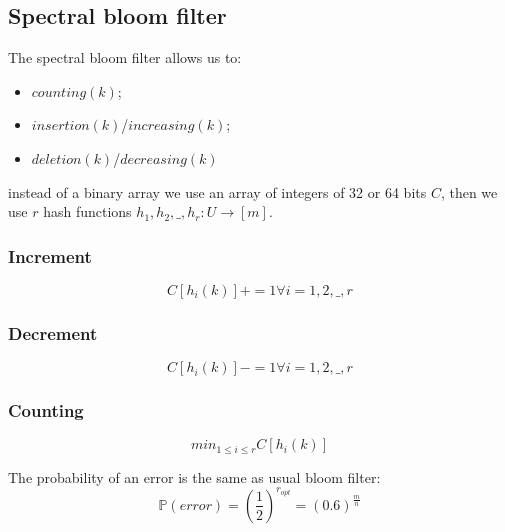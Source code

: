 \subsection{Spectral bloom filter}
The spectral bloom filter allows us to:
\begin{itemize}
    \item $counting(k)$;
    \item $insertion(k)$/$increasing(k)$;
    \item $deletion(k)$/$decreasing(k)$
\end{itemize}
instead of a binary array we use an array of integers of 32 or 64 bits $C$, then we use $r$ hash functions $h_1, h_2, \_, h_r : U \xrightarrow{} [m]$.

\subsubsection{Increment}
$$
    C[h_i(k)] += 1 \forall i = 1, 2, \_, r
$$

\subsubsection{Decrement}
$$
    C[h_i(k)] -= 1 \forall i = 1, 2, \_, r
$$

\subsubsection{Counting}
$$
    min_{1 \leq i \leq r} C[h_i(k)]
$$

The probability of an error is the same as usual bloom filter:
$$
    \mathbb{P}(error) = \left( \frac{1}{2} \right)^{r_{opt}} = (0.6)^{\frac{m}{n}}
$$


